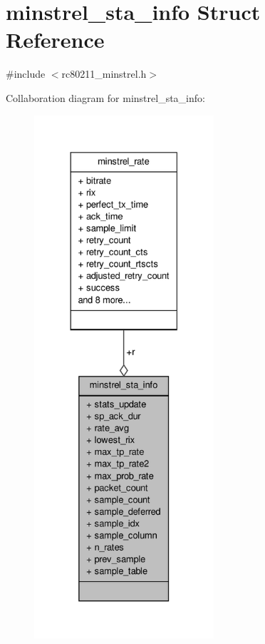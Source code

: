 \hypertarget{structminstrel__sta__info}{\section{minstrel\-\_\-sta\-\_\-info Struct Reference}
\label{structminstrel__sta__info}
}


{\ttfamily \#include $<$rc80211\-\_\-minstrel.\-h$>$}



Collaboration diagram for minstrel\-\_\-sta\-\_\-info\-:
\nopagebreak
\begin{figure}[H]
\begin{center}
\leavevmode
\includegraphics[height=550pt]{structminstrel__sta__info__coll__graph}
\end{center}
\end{figure}
